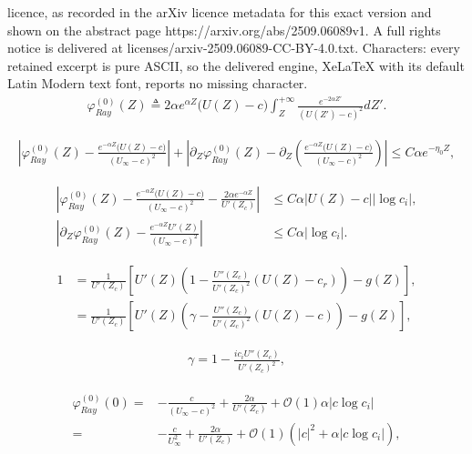 \documentclass[10pt,a4paper]{amsart}
\begin{document}
licence, as recorded in the arXiv licence metadata for this exact version and shown on the abstract page https://arxiv.org/abs/2509.06089v1. A full rights notice is delivered at licenses/arxiv-2509.06089-CC-BY-4.0.txt. Characters: every retained excerpt is pure ASCII, so the delivered engine, XeLaTeX with its default Latin Modern text font, reports no missing character.
\begin{align}\label{eq:ray-main-def}
	\varphi_{Ray}^{(0)}(Z)\triangleq2\alpha e^{\alpha Z}\big(U(Z)-c\big)\int_Z^{+\infty}\frac{e^{-2\alpha Z'}}{(U(Z')-c)^2}dZ'.
\end{align}

		\begin{align}
			\left|\varphi_{Ray}^{(0)}(Z)-\frac{e^{-\alpha Z}\big(U(Z)-c\big)}{(U_\infty-c)^2}\right|+\left|\partial_Z\varphi_{Ray}^{(0)}(Z)-\partial_Z\left(\frac{e^{-\alpha Z}\big(U(Z)-c\big)}{(U_\infty-c)^2}\right) \right|\leq C\alpha e^{-\eta_0 Z},\label{p1}
		\end{align}

		\begin{align}
			\left|\varphi_{Ray}^{(0)}(Z)-\frac{e^{-\alpha Z}\big(U(Z)-c\big)}{(U_\infty-c)^2}-\frac{2\alpha e^{-\alpha Z}}{U'(Z_c)} \right|&\leq C\alpha|U(Z)-c||\log c_i|,\label{p2}\\
			\left|\partial_Z\varphi_{Ray}^{(0)}(Z)-\frac{e^{-\alpha Z}U'(Z)}{(U_\infty-c)^2} \right|&\leq C\alpha|\log c_i|.\label{p3}
		\end{align}

	\begin{align}
	1&=\frac{1}{U'(Z_c)}\left[U'(Z)\left(1-\frac{U''(Z_c)}{U'(Z_c)^2}(U(Z)-c_r)\right)-g(Z)\right],\nonumber\\
	&=\frac{1}{U'(Z_c)}\left[U'(Z)\left(\gamma-\frac{U''(Z_c)}{U'(Z_c)^2}(U(Z)-c)\right)-g(Z)\right],
	\label{d}
	\end{align}

\begin{align}
	\gamma= 1-\frac{ic_iU''(Z_c)}{U'(Z_c)^2},\label{gamma}
\end{align}

	\begin{align}\label{phi0-0-exp}\begin{aligned}
			\varphi_{Ray}^{(0)}(0) =& -\frac{c}{(U_\infty-c)^2}+\frac{2\alpha}{U'(Z_c)}
			+\mathcal{O}(1)\alpha|c\log c_i|\\
			=&-\frac{c}{U_\infty^2}+\frac{2\alpha}{U'(Z_c)}
			+\mathcal{O}(1)(|c|^2+\alpha|c\log c_i|), 
	\end{aligned}\end{align}
\end{document}
